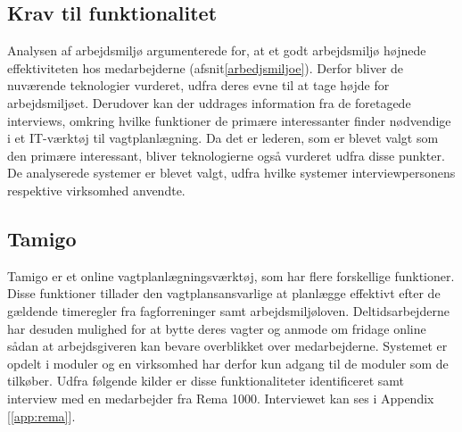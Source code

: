 \subsection{Krav til funktionalitet}
Analysen af arbejdsmiljø argumenterede for, at et godt arbejdsmiljø højnede effektiviteten hos medarbejderne (afsnit\ref{arbedjsmiljoe}). Derfor bliver de nuværende teknologier vurderet, udfra deres evne til at tage højde for arbejdsmiljøet. Derudover kan der uddrages information fra de foretagede interviews, omkring hvilke funktioner de primære interessanter finder nødvendige i et IT-værktøj til vagtplanlægning. Da det er lederen, som er blevet valgt som den primære interessant, bliver teknologierne også vurderet udfra disse punkter. De analyserede systemer er blevet valgt, udfra hvilke systemer interviewpersonens respektive virksomhed anvendte. 

\subsection{Tamigo}
Tamigo er et online vagtplanlægningsværktøj, som har flere forskellige funktioner. Disse funktioner tillader den vagtplansansvarlige at planlægge effektivt efter de gældende timeregler fra fagforreninger samt arbejdsmiljøloven. Deltidsarbejderne har desuden mulighed for at bytte deres vagter og anmode om fridage online sådan at arbejdsgiveren kan bevare overblikket over medarbejderne. Systemet er opdelt i moduler og en virksomhed har derfor kun adgang til de moduler som de tilkøber. Udfra følgende kilder er disse funktionaliteter identificeret \citep{Tamigo, Trustpilot} samt interview med en medarbejder fra Rema 1000. Interviewet kan ses i Appendix [\ref{app:rema}].

